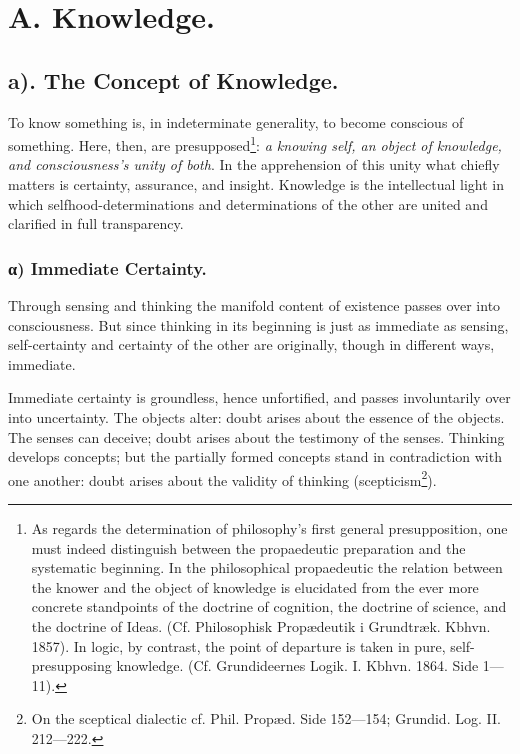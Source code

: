 \documentclass[12pt]{book}
\begin{document}
\mainmatter

\chapter*{A. Knowledge.}
\section*{a). The Concept of Knowledge.}

To know something is, in indeterminate generality, to become
conscious of something. Here, then, are
presupposed\footnote{As regards the determination of philosophy's
first general presupposition, one must indeed distinguish between the
propaedeutic preparation and the systematic beginning. In the
philosophical propaedeutic the relation between the knower and the
object of knowledge is elucidated from the ever more concrete
standpoints of the doctrine of cognition, the doctrine of science,
and the doctrine of Ideas. (Cf. Philosophisk Propædeutik i
Grundtræk. Kbhvn. 1857). In logic, by contrast, the point of
departure is taken in pure, self-presupposing knowledge. (Cf.
Grundideernes Logik. I. Kbhvn. 1864. Side 1---11).}:
\emph{a knowing self, an object of knowledge, and consciousness's
unity of both}. In the apprehension of this unity what chiefly
matters is certainty, assurance, and insight. Knowledge is the
intellectual light in which selfhood-determinations and
determinations of the other are united and clarified in full
transparency.

\subsection*{α) Immediate Certainty.}

Through sensing and thinking the manifold content of existence
passes over into consciousness. But since thinking in its beginning
is just as immediate as sensing, self-certainty and certainty of the
other are originally, though in different ways, immediate.

Immediate certainty is groundless, hence unfortified, and passes
involuntarily over into uncertainty. The objects alter: doubt arises
about the essence of the objects. The senses can deceive; doubt
arises about the testimony of the senses. Thinking develops
concepts; but the partially formed concepts stand in contradiction
with one another: doubt arises about the validity of thinking
(scepticism\footnote{On the sceptical dialectic cf. Phil. Propæd.
Side 152---154; Grundid. Log. II. 212---222.}).
\end{document}
